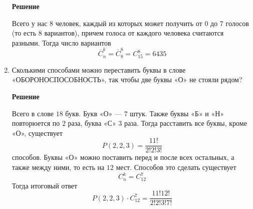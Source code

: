 \documentclass[12pt]{article}
\begin{document}
\begin{enumerate}[label={\textbf{\arabic{section}.\arabic*}}]
		\textbf{Решение}
		
		Всего у нас $8$ человек, каждый из которых может получить от $0$ до $7$ голосов (то есть $8$ вариантов), причем голоса от каждого человека считаются разными. Тогда число вариантов
		$$
		\overline{C}_n^k = \overline{C}_8^8 = C_{15}^8 = 6435
		$$
		
		\item Сколькими способами можно переставить буквы в слове «ОБОРОНОСПОСОБНОСТЬ», так чтобы две буквы «О» не стояли рядом?
		
		\textbf{Решение}
		
		Всего в слове $18$ букв. Букв «О» --- $7$ штук. Также буквы «Б» и «Н» повторюется по $2$ раза, буква «С» $3$ раза. Тогда расставить все буквы, кроме «О», существует
		$$
		P(2,2,3) = \frac{11!}{2!2!3!} 
		$$
		способов. Буквы «О» можно поставить перед и после всех остальных, а также между ними, то есть на $12$ мест. Способов это сделать существует
		$$
		C_n^k = C_{12}^7
		$$
		Тогда итоговый ответ
		$$
		P(2,2,3)\cdot C_{12}^7 = \frac{11!12!}{2!2!3!7!}
		$$
	\end{enumerate}
	\newpage
\end{document}
